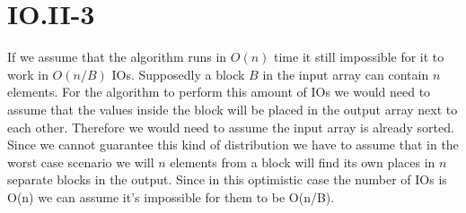 \section*{IO.II-3}

If we assume that the algorithm runs in $ O(n) $ time it still impossible for it to work in  $ O(n/B) $ IOs. Supposedly a block $ B $ in the input array can contain $ n $ elements. For the algorithm to perform this amount of IOs we would need to assume that the values inside the block will be placed in the output array next to each other. Therefore we would need to assume the input array is already sorted. Since we cannot guarantee this kind of distribution we have to assume that in the worst case scenario we will $ n $ elements from a block will find its own places in $ n $ separate blocks in the output. Since in this optimistic case the number of IOs is O(n) we can assume it's impossible for them to be O(n/B).
